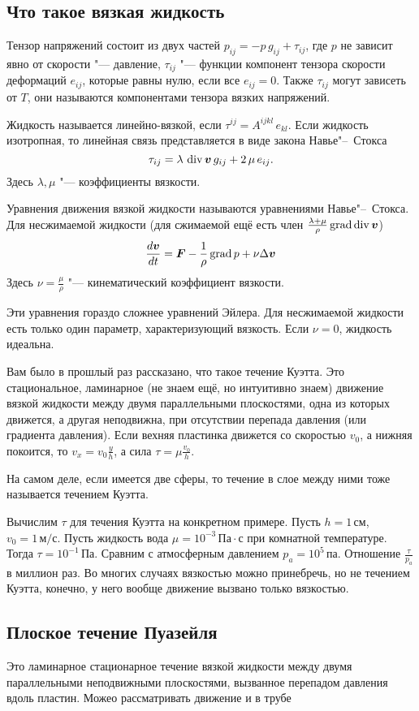 \subsection{Что такое вязкая жидкость}
Тензор напряжений состоит из двух частей $p_{ij} = -p\,g_{ij} + \tau_{ij}$, где $p$ не зависит явно от скорости "--- давление, $\tau_{ij}$ "--- функции компонент тензора скорости деформаций $e_{ij}$, которые равны нулю, если все $e_{ij}=0$. Также $\tau_{ij}$ могут зависеть от $T$, они называются компонентами тензора вязких напряжений.

Жидкость называется линейно-вязкой, если $\tau^{ij} = A^{ijkl}\,e_{kl}$. Если жидкость изотропная, то линейная связь представляется в виде закона Навье"--~Стокса
\[
  \tau_{ij} = \lambda\,\operatorname{div}\boldsymbol{v}\,g_{ij} + 2\,\mu\,e_{ij}.
\]
Здесь $\lambda,\mu$ "--- коэффициенты вязкости.

Уравнения движения вязкой жидкости называются уравнениями Навье"--~Стокса. Для несжимаемой жидкости (для сжимаемой ещё есть член $\frac{\lambda+\mu}\rho\operatorname{grad}\operatorname{div}\boldsymbol{v}$)
\[
	\frac{d\boldsymbol{v}}{dt} = \boldsymbol{F} - \frac1\rho\operatorname{grad} p + \nu\Delta\boldsymbol{v}
\]
Здесь $\nu = \frac\mu\rho$ "--- кинематический коэффициент вязкости.

Эти уравнения гораздо сложнее уравнений Эйлера. Для несжимаемой жидкости есть только один параметр, характеризующий вязкость. Если $\nu=0$, жидкость идеальна.

Вам было в прошлый раз рассказано, что такое течение Куэтта. Это стациональное, ламинарное (не знаем ещё, но интуитивно знаем) движение вязкой жидкости между двумя параллельными плоскостями, одна из которых движется, а другая неподвижна, при отсутствии перепада давления (или градиента давления).
Если вехняя пластинка движется со скоростью $v_0$, а нижняя покоится, то $v_x = v_0\frac yh$, а сила $\tau = \mu\frac {v_0}h$.

На самом деле, если имеется две сферы, то течение в слое между ними тоже называется течением Куэтта.

Вычислим $\tau$ для течения Куэтта на конкретном примере. Пусть $h=1\,\text{см}$, $v_0 = 1\,\text{м}/\text{с}$. Пусть жидкость вода $\mu = 10^{-3}\,\text{Па}\cdot\text{с}$ при комнатной температуре. Тогда $\tau = 10^{-1}\,\text{Па}$. Сравним с атмосферным давлением $p_a = 10^5\,\text{па}$. Отношение $\frac{\tau}{p_a}$ в миллион раз. Во многих случаях вязкостью можно принебречь, но не течением Куэтта, конечно, у него вообще движение вызвано только вязкостью.

\subsection{Плоское течение Пуазейля}
Это ламинарное стационарное течение вязкой жидкости между двумя параллельными неподвижными плоскостями, вызванное перепадом давления вдоль пластин.
Можео рассматривать движение и в трубе
